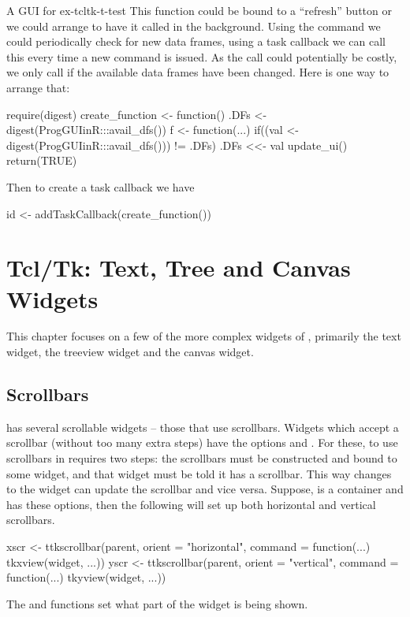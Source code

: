 \begin{example}{A GUI for }{ex-tcltk-t-test}
This function could be bound to a ``refresh'' button or we could
arrange to have it called in the background. Using the 
command we could periodically check for new data frames, using a
task callback we can call this every time a
new command is issued.  As the call could potentially be costly, we
only call if the available data frames have been changed. Here is one
way to arrange that:
\begin{Schunk}
\begin{Sinput}
 require(digest)
 create_function <- function() {
   .DFs <- digest(ProgGUIinR:::avail_dfs())
   f <- function(...) {
     if((val <- digest(ProgGUIinR:::avail_dfs())) != .DFs) {
       .DFs <<- val
       update_ui()
     }
     return(TRUE)
   }
 }
\end{Sinput}
\end{Schunk}
Then to create a task callback we have
\begin{Schunk}
\begin{Sinput}
 id <- addTaskCallback(create_function())
\end{Sinput}
\end{Schunk}

\end{example}


\chapter{Tcl/Tk: Text, Tree and Canvas Widgets}
\label{sec:tcltk:scrollable-widgets}
This chapter focuses on a few of the more complex widgets of \Tk,
primarily the text widget, the treeview widget and the canvas
widget.

\section{Scrollbars}
\label{sec:tcltk:scrollbars}

\TK\/ has several scrollable widgets -- those that use scrollbars.
Widgets which accept a scrollbar (without too many extra steps) have
the options  and .  For
these, to use scrollbars in  requires two steps: the
scrollbars must be constructed and bound to some widget, and that
widget must be told it has a scrollbar. This way changes to the widget
can update the scrollbar and vice versa. Suppose,  is a
container and  has these options, then the following will
set up both horizontal and vertical scrollbars.
%
\begin{Schunk}
\begin{Sinput}
 xscr <- ttkscrollbar(parent, orient = "horizontal",
                  command = function(...) tkxview(widget, ...))
 yscr <- ttkscrollbar(parent, orient = "vertical",
                  command = function(...) tkyview(widget, ...))
\end{Sinput}
\end{Schunk}
%
The  and  functions set what part of the widget is being shown.

